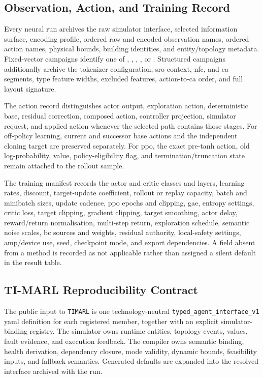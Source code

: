 \subsection{Observation, Action, and Training Record}

Every neural run archives the raw simulator interface, selected information surface, encoding profile, ordered raw and encoded observation names, ordered action names, physical bounds, building identities, and entity/topology metadata. Fixed-vector campaigns identify one of , , , , or . Structured campaigns additionally archive the tokenizer configuration, \gls{sro} context, \gls{nfc}, and \gls{ca} segments, type feature widths, excluded features, action-to-\gls{ca} order, and full layout signature.

The action record distinguishes actor output, exploration action, deterministic base, residual correction, composed action, controller projection, simulator request, and applied action whenever the selected path contains those stages. For off-policy learning, current and successor base actions and the independent cloning target are preserved separately. For \gls{ppo}, the exact pre-tanh action, old log-probability, value, policy-eligibility flag, and termination/truncation state remain attached to the rollout sample.

The training manifest records the actor and critic classes and layers, learning rates, discount, target-update coefficient, rollout or replay capacity, batch and minibatch sizes, update cadence, \gls{ppo} epochs and clipping, \gls{gae}, entropy settings, critic loss, target clipping, gradient clipping, target smoothing, actor delay, reward/return normalisation, multi-step return, exploration schedule, semantic noise scales, \gls{bc} sources and weights, residual authority, local-safety settings, \gls{amp}/device use, seed, checkpoint mode, and export dependencies. A field absent from a method is recorded as not applicable rather than assigned a silent default in the result table.

\subsection{TI-MARL Reproducibility Contract}
\label{app:timarl-contract}

The public input to \texttt{TIMARL} is one technology-neutral \texttt{typed\_agent\_interface\_v1} \gls{yaml} definition for each registered member, together with an explicit simulator-binding registry. The simulator owns runtime entities, topology events, values, fault evidence, and execution feedback. The compiler owns semantic binding, health derivation, dependency closure, mode validity, dynamic bounds, feasibility inputs, and fallback semantics. Generated defaults are expanded into the resolved interface archived with the run.

